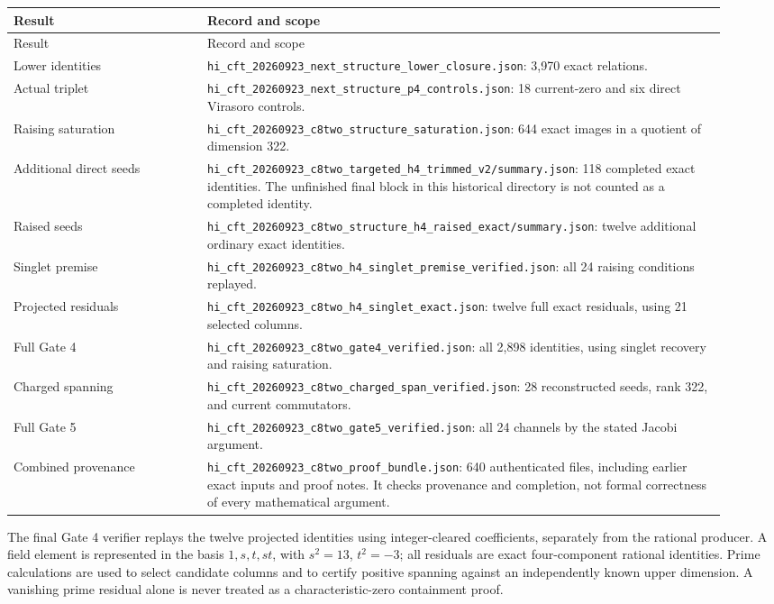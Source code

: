 \documentclass[11pt,a4paper]{article}
\theoremstyle{definition}
\newcommand{\artifact}[1]{\textnormal{\nolinkurl{#1}}}
\begin{document}
\begin{longtable}{@{}p{0.25\linewidth}p{0.67\linewidth}@{}}
\toprule
Result & Record and scope\\
\midrule\endfirsthead
\toprule Result & Record and scope\\\midrule\endhead
\bottomrule\endfoot
Lower identities &
\artifact{hi_cft_20260923_next_structure_lower_closure.json}:
3,970 exact relations.\\
Actual triplet &
\artifact{hi_cft_20260923_next_structure_p4_controls.json}:
18 current-zero and six direct Virasoro controls.\\
Raising saturation &
\artifact{hi_cft_20260923_c8two_structure_saturation.json}:
644 exact images in a quotient of dimension 322.\\
Additional direct seeds &
\artifact{hi_cft_20260923_c8two_targeted_h4_trimmed_v2/summary.json}:
118 completed exact identities. The unfinished final block in this
historical directory is not counted as a completed identity.\\
Raised seeds &
\artifact{hi_cft_20260923_c8two_structure_h4_raised_exact/summary.json}:
twelve additional ordinary exact identities.\\
Singlet premise &
\artifact{hi_cft_20260923_c8two_h4_singlet_premise_verified.json}:
all 24 raising conditions replayed.\\
Projected residuals &
\artifact{hi_cft_20260923_c8two_h4_singlet_exact.json}:
twelve full exact residuals, using 21 selected columns.\\
Full Gate 4 &
\artifact{hi_cft_20260923_c8two_gate4_verified.json}:
all 2,898 identities, using singlet recovery and raising saturation.\\
Charged spanning &
\artifact{hi_cft_20260923_c8two_charged_span_verified.json}:
28 reconstructed seeds, rank 322, and current commutators.\\
Full Gate 5 &
\artifact{hi_cft_20260923_c8two_gate5_verified.json}:
all 24 channels by the stated Jacobi argument.\\
Combined provenance &
\artifact{hi_cft_20260923_c8two_proof_bundle.json}:
640 authenticated files, including earlier exact inputs and proof notes.
It checks provenance and completion, not formal correctness of every
mathematical argument.\\
\end{longtable}

The final Gate 4 verifier replays the twelve projected identities using
integer-cleared coefficients, separately from the rational producer.
A field element is represented in the basis
\(1,s,t,st\), with \(s^2=13\), \(t^2=-3\); all residuals are
exact four-component rational identities. Prime calculations are used
to select candidate columns and to certify positive spanning against
an independently known upper dimension. A vanishing prime residual
alone is never treated as a characteristic-zero containment proof.
\end{document}
